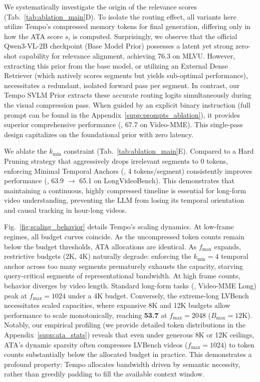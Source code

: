 %
We systematically investigate the origin of the relevance scores (Tab.~\ref{tab:ablation_main}D). To isolate the routing effect, all variants here utilize Tempo's compressed memory tokens for final generation, differing only in how the ATA score $s_i$ is computed.
%
Surprisingly, we observe that the official Qwen3-VL-2B checkpoint (Base Model Prior) possesses a latent yet strong zero-shot capability for relevance alignment, achieving 76.3 on MLVU. However, extracting this prior from the base model, or utilizing an External Dense Retriever (which natively scores segments but yields sub-optimal performance), necessitates a redundant, isolated forward pass per segment.
%
In contrast, our Tempo SVLM Prior extracts these accurate routing logits simultaneously during the visual compression pass. When guided by an explicit binary instruction (full prompt can be found in the Appendix~\ref{supp:prompts_ablation}), it provides superior comprehensive performance (\eg, 67.7 on Video-MME). This single-pass design capitalizes on the foundational prior with zero latency.

%
We ablate the $k_{\min}$ constraint (Tab.~\ref{tab:ablation_main}E). Compared to a Hard Pruning strategy that aggressively drops irrelevant segments to 0 tokens, enforcing Minimal Temporal Anchors (\eg, 4 tokens/segment) consistently improves performance (\eg, 63.9 $\rightarrow$ 65.1 on LongVideoBench). This demonstrates that maintaining a continuous, highly compressed timeline is essential for long-form video understanding, preventing the LLM from losing its temporal orientation and causal tracking in hour-long videos.

%
Fig.~\ref{fig:scaling_behavior} details Tempo's scaling dynamics. At low-frame regimes, all budget curves coincide. As the uncompressed token counts remain below the budget thresholds, ATA allocations are identical. As $f_{\max}$ expands, restrictive budgets (2K, 4K) naturally degrade: enforcing the $k_{\min}=4$ temporal anchor across too many segments prematurely exhausts the capacity, starving query-critical segments of representational bandwidth.
%
At high frame counts, behavior diverges by video length. Standard long-form tasks (\eg, Video-MME Long) peak at $f_{\max}=1024$ under a 4K budget. Conversely, the extreme-long LVBench necessitates scaled capacities, where expansive 8K and 12K budgets allow performance to scale monotonically, reaching \textbf{53.7} at $f_{\max}=2048$ ($B_{\max}=12$K).
%
Notably, our empirical profiling (we provide detailed token distributions in the Appendix~\ref{supp:ata_stats}) reveals that even under generous 8K or 12K ceilings, ATA's dynamic sparsity often compresses LVBench videos ($f_{\max}=1024$) to token counts substantially below the allocated budget in practice. This demonstrates a profound property: Tempo allocates bandwidth driven by semantic necessity, rather than greedily padding to fill the available context window.
